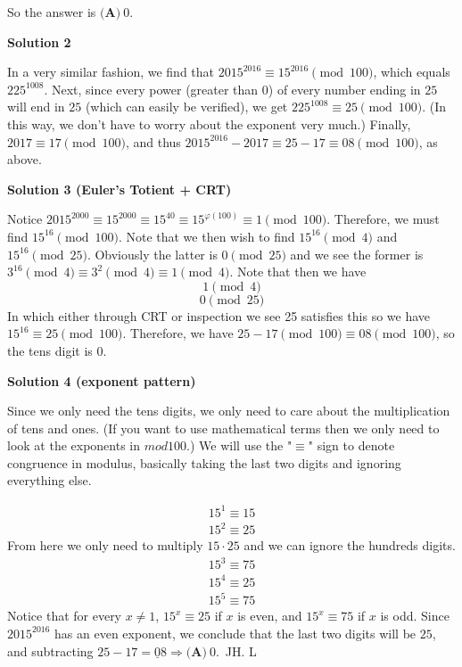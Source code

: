 \begin{enumerate}
 So the answer is $\textbf{(A)}\ \boxed{0}$.

 



\textbf{Solution 2}

In a very similar fashion, we find that $2015^{2016} \equiv 15^{2016} \pmod{100}$, which equals $225^{1008}$. Next, since every power (greater than $0$) of every number ending in $25$ will end in $25$ (which can easily be verified), we get $225^{1008} \equiv 25 \pmod{100}$. (In this way, we don't have to worry about the exponent very much.) Finally, $2017 \equiv 17 \pmod{100}$, and thus $2015^{2016}-2017 \equiv 25-17 \equiv 08 \pmod{100}$, as above.

 



\textbf{Solution 3 (Euler's Totient + CRT)}

Notice $2015^{2000} \equiv 15^{2000} \equiv 15^{40} \equiv 15^{\varphi(100)} \equiv 1 \pmod{100}$. Therefore, we must find $15^{16} \pmod{100}$. Note that we then wish to find $15^{16} \pmod{4}$ and $15^{16} \pmod{25}$. Obviously the latter is $0 \pmod{25}$ and we see the former is $3^{16} \pmod{4} \equiv 3^{2} \pmod{4} \equiv 1 \pmod{4}$. Note that then we have
 \[1 \pmod{4}\]
 \[0 \pmod{25}\]In which either through CRT or inspection we see 25 satisfies this so we have $15^{16} \equiv 25 \pmod{100}$. Therefore, we have $25-17 \pmod{100} \equiv 08 \pmod{100}$, so the tens digit is $\boxed{0}$.

 



\textbf{Solution 4 (exponent pattern)}

Since we only need the tens digits, we only need to care about the multiplication of tens and ones. (If you want to use mathematical terms then we only need to look at the exponents in $mod 100$.) We will use the "$\equiv$" sign to denote congruence in modulus, basically taking the last two digits and ignoring everything else.

 
 \[\begin{split} 15^{1}\equiv15 \\ 15^{2}\equiv25 \end{split}\]From here we only need to multiply $15\cdot25$ and we can ignore the hundreds digits.
 \[\begin{split} 15^{3}\equiv75 \\ 15^{4}\equiv25 \\ 15^{5}\equiv75 \end{split}\]Notice that for every $x\neq1$, $15^{x}\equiv25$ if $x$ is even, and $15^{x}\equiv75$ if $x$ is odd. Since $2015^{2016}$ has an even exponent, we conclude that the last two digits will be $25$, and subtracting $25-17=\underline{0}8 \Longrightarrow \boxed{\textbf{(A)}\ 0}$.~JH. L


\end{enumerate}
